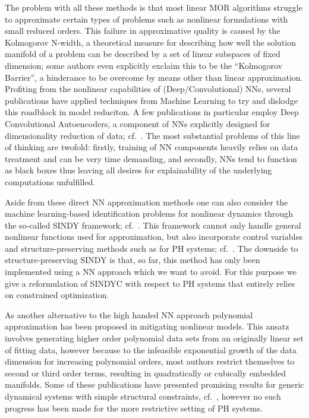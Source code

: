 The problem with all these methods is that most linear MOR algorithms struggle to approximate certain types of problems such as nonlinear formulations with small reduced orders.
This failure in approximative quality is caused by the Kolmogorov N-width, a theoretical measure for describing how well the solution manifold of a problem can be described by a set of linear subspaces of fixed dimension; some authors even explicitly exclaim this to be the ``Kolmogorov Barrier'', a hinderance to be overcome by means other than linear approximation.
Profiting from the nonlinear capabilities of (Deep/Convolutional) \acp{NN}, several publications have applied techniques from Machine Learning to try and dislodge this roadblock in model reduciton.
A few publications in particular employ Deep Convolutional Autoencoders, a component of \acp{NN} explicitly designed for dimensionality reduction of data; cf.~\cite{Lee2020, Benner2022, Romor2023, Buchfink2023}.
The most substantial problems of this line of thinking are twofold: firstly, training of \ac{NN} components heavily relies on data treatment and can be very time demanding, and secondly, \acp{NN} tend to function as black boxes thus leaving all desires for explainability of the underlying computations unfulfilled.

Aside from these direct \ac{NN} approximation methods one can also consider the machine learning-based identification problems for nonlinear dynamics through the so-called \acs{SINDY} framework; cf.~\cite{Brunton2016, Kaheman2020}.
This framework cannot only handle general nonlinear functions used for approximation, but also incorporate control variables and structure-preserving methods such as for \ac{PH} systems; cf.~\cite{Kaiser2018, Lee2022}.
The downside to structure-preserving \acs{SINDY} is that, so far, this method has only been implemented using a \ac{NN} approach which we want to avoid.
For this purpose we give a reformulation of \acs{SINDYC} with respect to \ac{PH} systems that entirely relies on constrained optimization.

As another alternative to the high handed \ac{NN} approach polynomial approximation has been proposed in mitigating nonlinear models.
This ansatz involves generating higher order polynomial data sets from an originally linear set of fitting data, however because to the infeasible exponential growth of the data dimension for increasing polynomial orders, most authors restrict themselves to second or third order terms, resulting in quadratically or cubically embedded manifolds.
Some of these publications have presented promising results for generic dynamical systems with simple structural constraints, cf.~\cite{Gu2011, Peherstorfer2016, Jain2017, Rutzmoser2017, Kramer2019, BGK2020, BGH2020, Qian2020, Gosea2021, Barnett2022, Khodabakhshi2022, Qian2022, Geelen2023}, however no such progress has been made for the more restrictive setting of \ac{PH} systems.

